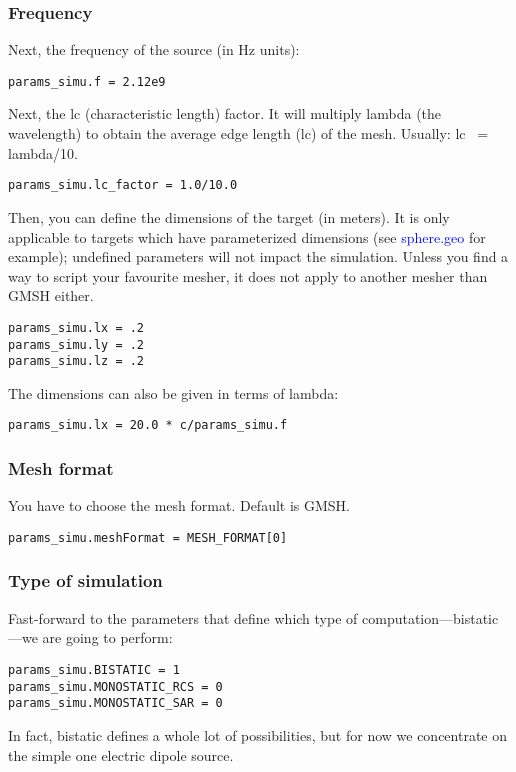 \documentclass[a4paper,10pt]{book}
\newcommand{\file}[1] {\textcolor{blue}{\textsf{#1}}}
\begin{document}
\subsubsection{Frequency}
%
\par
Next, the frequency of the source (in Hz units):
\begin{verbatim}
params_simu.f = 2.12e9
\end{verbatim}
%
\par
Next, the lc (characteristic length) factor. It will multiply lambda (the wavelength) to obtain the average edge length (lc) of the mesh. Usually: lc ~= lambda/10.
\begin{verbatim}
params_simu.lc_factor = 1.0/10.0
\end{verbatim}
%
\par
Then, you can define the dimensions of the target (in meters). It is only applicable to targets which have parameterized dimensions (see \file{sphere.geo} for example); undefined parameters will not impact the simulation. Unless you find a way to script your favourite mesher, it does not apply to another mesher than GMSH either.
\begin{verbatim}
params_simu.lx = .2
params_simu.ly = .2
params_simu.lz = .2
\end{verbatim}
The dimensions can also be given in terms of lambda:
\begin{verbatim}
params_simu.lx = 20.0 * c/params_simu.f
\end{verbatim}

\subsubsection{Mesh format}
%
\par
You have to choose the mesh format. Default is GMSH.
\begin{verbatim}
params_simu.meshFormat = MESH_FORMAT[0]
\end{verbatim}

\subsubsection{Type of simulation}
%
\par
Fast-forward to the parameters that define which type of computation---bistatic---we are going to perform:
\begin{verbatim}
params_simu.BISTATIC = 1
params_simu.MONOSTATIC_RCS = 0
params_simu.MONOSTATIC_SAR = 0
\end{verbatim}
In fact, bistatic defines a whole lot of possibilities, but for now we concentrate on the simple one electric dipole source.
\end{document}
